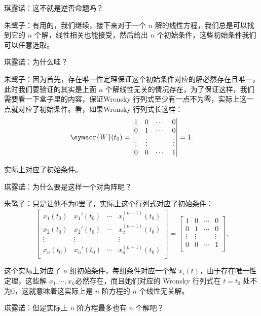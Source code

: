 琪露诺：这不就是逆否命题吗？

朱鹭子：有用的，我们继续，接下来对于一个 \(n\) 解的线性方程，我们总是可以找到它的 \(n\) 个解，线性相关也能接受，然后给出 \(n\) 个初始条件，这些初始条件我们可以任意选取。

琪露诺：为什么哇？

朱鹭子：因为首先，存在唯一性定理保证这个初始条件对应的解必然存在且唯一，此时我们要验证的其实是上面 \(n\) 个解线性无关的情况存在，为了保证这样，我们需要看一下盒子里的内容，保证Wronsky 行列式至少有一点不为零，实际上这一点就对应了初始条件。看，如果Wronsky 行列式长这样：
\[
	\symscr{W} (t_0)=\begin{vmatrix}
		1      & 0      & \cdots & 0      \\
		0      & 1      & \cdots & 0      \\
		\vdots & \vdots &        & \vdots \\
		0      & 0      & \cdots & 1      \\
	\end{vmatrix}=1
	.\]

实际上对应了初始条件。

琪露诺：为什么要是这样一个对角阵呢？

朱鹭子：只是让他不为0罢了，实际上这个行列式对应了初始条件：
\[
	\begin{bmatrix}
		x_1(t_0) & x_1'(t_0) & \cdots & x_1^{(n-1)}(t_0) \\
		x_2(t_0) & x_2'(t_0) & \cdots & x^{(n-1)}_2(t_0) \\
		\vdots   & \vdots    &        & \vdots           \\
		x_n(t_0) & x_n'(t_0) & \cdots & x_n^{(n-1)}(t_0) \\
	\end{bmatrix}=\begin{bmatrix}
		1      & 0      & \cdots & 0      \\
		0      & 1      & \cdots & 0      \\
		\vdots & \vdots &        & \vdots \\
		0      & 0      & \cdots & 1      \\
	\end{bmatrix}
	.\]

这个实际上对应了 \(n\) 组初始条件，每组条件对应一个解 \(x_i(t)\)，由于存在唯一性定理，这些解 \(x_1,\cdots ,x_n\)必然存在，而且她们对应的 Wronsky 行列式在 \(t=t_0\) 处不为0，这就意味着这实际上是 \(n\) 阶方程的 \(n\) 个线性无关解。

琪露诺：但是实际上 \(n\) 阶方程最多也有 \(n\) 个解吧？

